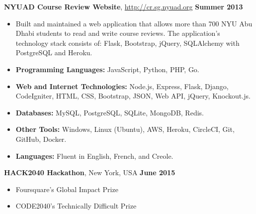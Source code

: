 \documentclass[11pt]{article} %
\begin{document}
\noindent \centerline{\normalsize \textbf{NYUAD Course Review Website}, \url{http://cr.sg.nyuad.org} \hfill \textbf{Summer 2013}}
\begin{itemize}\itemsep-0.2em
  \item Built and maintained a web application that allows more than 700 NYU Abu Dhabi students to read and write course reviews. The application's technology stack consists of: Flask, Bootstrap, jQuery, SQLAlchemy with PostgreSQL and Heroku.
\end{itemize}
\medskip

\begin{itemize}\itemsep-0.2em
  \item \textbf{Programming Languages:} JavaScript, Python, PHP, Go.
  \item \textbf{Web and Internet Technologies:} Node.js, Express, Flask, Django, CodeIgniter, HTML, CSS, Bootstrap, JSON, Web API, jQuery, Knockout.js.
  \item \textbf{Databases:} MySQL, PostgreSQL, SQLite, MongoDB, Redis.
  \item \textbf{Other Tools:} Windows, Linux (Ubuntu), AWS, Heroku, CircleCI, Git, GitHub, Docker.
  \item \textbf{Languages:} Fluent in English, French, and Creole.
\end{itemize}
\medskip

 \medskip

\noindent \centerline{\normalsize  \textbf {HACK2040 Hackathon}, New York, USA \hfill \textbf{June 2015}}
\begin{itemize}\itemsep-0.35em
  \item Foursquare's Global Impact Prize
  \item CODE2040's Technically Difficult Prize
\end{itemize}
\end{document}
